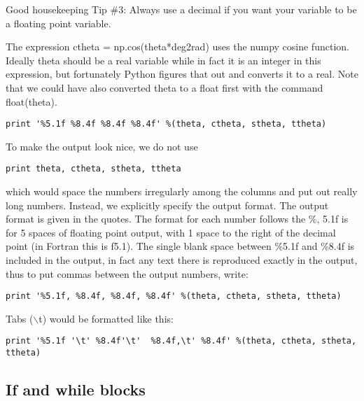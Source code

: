 {{\color{magenta}Good housekeeping Tip \#3:  Always use a decimal if you want your variable to be a floating point variable.}

The expression {\color{blue} ctheta = np.cos(theta*deg2rad)} uses the {\color{blue}numpy} cosine function. Ideally {\color{blue} theta} should be a real variable while in fact it is an integer
  in this expression, but fortunately Python figures that out and converts it to a real.   Note that we could have also converted theta to a float first with the command {\color{blue}float(theta)}.  
  
{\singlespacing \color{blue} \begin{verbatim}  
print '%5.1f %8.4f %8.4f %8.4f' %(theta, ctheta, stheta, ttheta)   
\end{verbatim}}
  
\noindent To make the output look nice, we do not use

{\singlespacing \color{blue} \begin{verbatim}  
print theta, ctheta, stheta, ttheta
\end{verbatim}}

\noindent which would space the numbers irregularly among the columns and put out really long numbers.  Instead,
we explicitly specify the output format.   The output format is given in the quotes.  The format for each
number follows the \%, 5.1f is for 5 spaces of floating point output, with 1
space to the right of the decimal point (in Fortran this is f5.1).  The single
blank space between \%5.1f and \%8.4f is included in the output, in fact any
text there is reproduced exactly in the output, thus to put commas between
the output numbers, write:

{\singlespacing \color{blue} \begin{verbatim}  
print '%5.1f, %8.4f, %8.4f, %8.4f' %(theta, ctheta, stheta, ttheta)   
\end{verbatim}}

\noindent Tabs ($\backslash$t) would be formatted like this:      

{\singlespacing \color{blue} \begin{verbatim}  
print '%5.1f '\t' %8.4f'\t'  %8.4f,\t' %8.4f' %(theta, ctheta, stheta, ttheta) 
\end{verbatim}  }  
  
       
\subsection{If and while blocks}

}
